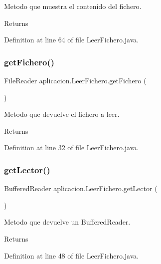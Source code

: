 Metodo que muestra el contenido del fichero. \begin{DoxyReturn}{Returns}

\end{DoxyReturn}


Definition at line 64 of file Leer\+Fichero.\+java.

\hypertarget{classaplicacion_1_1_leer_fichero_ac85026646b27dee1b9dd2d28eaa4ae59}{}\label{classaplicacion_1_1_leer_fichero_ac85026646b27dee1b9dd2d28eaa4ae59} 
\subsubsection{\texorpdfstring{get\+Fichero()}{getFichero()}}
{\footnotesize\ttfamily File\+Reader aplicacion.\+Leer\+Fichero.\+get\+Fichero (\begin{DoxyParamCaption}{ }\end{DoxyParamCaption})}

Metodo que devuelve el fichero a leer. \begin{DoxyReturn}{Returns}

\end{DoxyReturn}


Definition at line 32 of file Leer\+Fichero.\+java.

\hypertarget{classaplicacion_1_1_leer_fichero_ae9b6c34feb9e518c222eb23937a81716}{}\label{classaplicacion_1_1_leer_fichero_ae9b6c34feb9e518c222eb23937a81716} 
\subsubsection{\texorpdfstring{get\+Lector()}{getLector()}}
{\footnotesize\ttfamily Buffered\+Reader aplicacion.\+Leer\+Fichero.\+get\+Lector (\begin{DoxyParamCaption}{ }\end{DoxyParamCaption})}

Metodo que devuelve un Buffered\+Reader. \begin{DoxyReturn}{Returns}

\end{DoxyReturn}


Definition at line 48 of file Leer\+Fichero.\+java.

